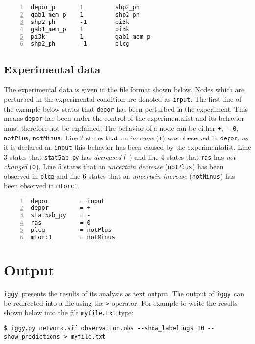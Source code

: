 \documentclass{article}
\newcommand\iggy{\texttt{iggy}}
\begin{document}
\begin{Verbatim}[frame=single,numbers=left]
depor_p       1         shp2_ph
gab1_mem_p    1         shp2_ph
shp2_ph       -1        pi3k
gab1_mem_p    1         pi3k
pi3k          1         gab1_mem_p
shp2_ph       -1        plcg
\end{Verbatim} 


\subsection{Experimental data}

The experimental data is given in the file format shown below.
Nodes which are perturbed in the experimental condition are denoted as \texttt{input}.
The first line of the example below states that \texttt{depor} has been perturbed in the experiment.
This means \texttt{depor} has been under the control of the experimentalist 
 and its behavior must therefore not be explained.
The behavior of a node can be either \texttt{+}, \texttt{-}, \texttt{0}, \texttt{notPlus}, \texttt{notMinus}.
Line 2 states that an \emph{increase} (\texttt{+}) was obeserved in \texttt{depor},
 as it is declared an \texttt{input} this behavior has been caused by the experimentalist.
Line 3 states that \texttt{stat5ab\_py} has \emph{decreased} (\texttt{-}) and
line 4 states that \texttt{ras} has \emph{not changed} (\texttt{0}).
Line 5 states that an \emph{uncertain decrease} (\texttt{notPlus}) has been observed in \texttt{plcg} and
line 6 states that an \emph{uncertain increase} (\texttt{notMinus}) has been observed in \texttt{mtorc1}.

\begin{Verbatim}[frame=single,numbers=left]
depor         = input 
depor         = +
stat5ab_py    = -
ras           = 0
plcg          = notPlus
mtorc1        = notMinus
\end{Verbatim}  


\section{Output}

\iggy\ presents the results of its analysis as text output. 
The output of \iggy\ can be redirected into a file using the \texttt{>} operator.
For example to write the results shown below into the file \texttt{myfile.txt} type:

\begin{Verbatim}[frame=single]
$ iggy.py network.sif observation.obs --show_labelings 10 --show_predictions > myfile.txt
\end{Verbatim}
\end{document}
